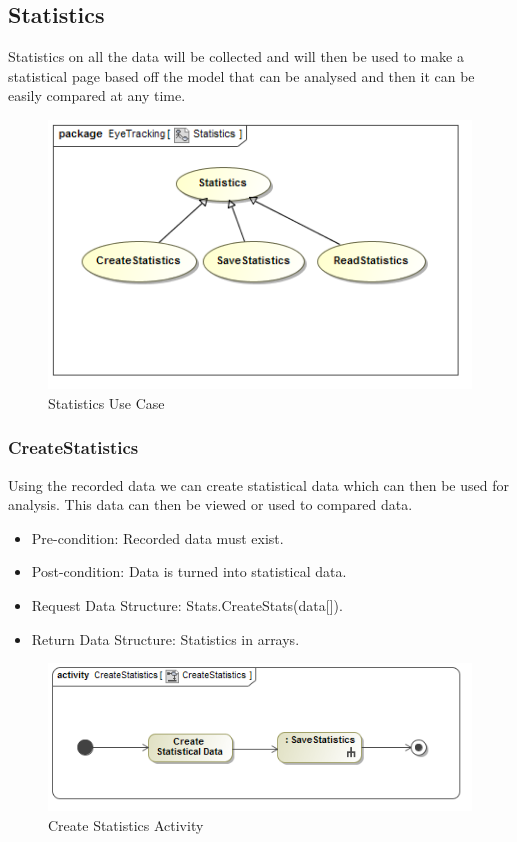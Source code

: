 \subsection{Statistics}
Statistics on all the data will be collected and will then be used to make a statistical page based off the model that can be analysed and then it can be easily compared at any time.
\newline
\begin{figure}[!ht]
	\centering
	\includegraphics[scale=0.5]{Diagrams/Use_Case_Diagram__Statistics.png}
	\caption{Statistics Use Case}
	\end{figure}
	
		\subsubsection{CreateStatistics}
Using the recorded data we can create statistical data which can then be used for analysis. This data can then be viewed or used to compared data.
\begin{itemize}
\item Pre-condition: Recorded data must exist.
\item Post-condition: Data is turned into statistical data.
\item Request Data Structure: Stats.CreateStats(data[]).
\item Return Data Structure: Statistics in arrays.
\end{itemize}

\begin{figure}[!ht]
	\centering
	\includegraphics[scale=0.5]{Diagrams/Activity_Diagram__CreateStatistics__CreateStatistics.png}
	\caption{Create Statistics Activity}
	\end{figure}
	
